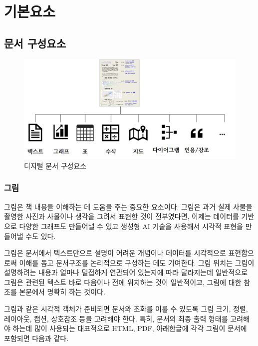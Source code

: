 \documentclass[
  letterpaper,
]{book}
\begin{document}
\part{기본요소}

\hypertarget{uxbb38uxc11c-uxad6cuxc131uxc694uxc18c}{%
\chapter{문서 구성요소}\label{uxbb38uxc11c-uxad6cuxc131uxc694uxc18c}}

\begin{figure}

{\centering \includegraphics{images/writing_document.jpg}

}

\caption{디지털 문서 구성요소}

\end{figure}

\hypertarget{uxadf8uxb9bc}{%
\section{그림}\label{uxadf8uxb9bc}}

그림은 책 내용을 이해하는 데 도움을 주는 중요한 요소이다. 그림은 과거
실제 사물을 촬영한 사진과 사물이나 생각을 그려서 표현한 것이 전부였다면,
이제는 데이터를 기반으로 다양한 그래프도 만들어낼 수 있고 생성형 AI
기술을 사용해서 시각적 표현을 만들어낼 수도 있다.

그림은 문서에서 텍스트만으로 설명이 어려운 개념이나 데이터를 시각적으로
표현함으로써 이해를 돕고 문서구조를 논리적으로 구성하는 데도 기여한다.
그림 위치는 그림이 설명하려는 내용과 얼마나 밀접하게 연관되어 있는지에
따라 달라지는데 일반적으로 그림은 관련된 텍스트 바로 다음이나 전에
위치하는 것이 일반적이고, 그림에 대한 참조를 본문에서 명확히 하는
것이다.

그림과 같은 시각적 객체가 준비되면 문서와 조화를 이룰 수 있도록 그림
크기, 정렬, 레이아웃, 캡션, 상호참조 등을 고려해야 한다. 특히, 문서의
최종 출력 형태를 고려해야 하는데 많이 사용되는 대표적으로 HTML, PDF,
아래한글에 각각 그림이 문서에 포함되면 다음과 같다.
\end{document}
